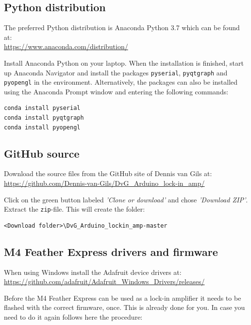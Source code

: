 \documentclass{article}
\newcommand{\code}[1]{\mbox{\texttt{#1}}}
\begin{document}
\subsection{Python distribution}
The preferred Python distribution is Anaconda Python 3.7 which can be found at:\\
\href{https://www.anaconda.com/distribution/}{https://www.anaconda.com/distribution/}

\bigskip\noindent
Install Anaconda Python on your laptop. When the installation is finished, start up Anaconda Navigator and install the packages \code{pyserial}, \code{pyqtgraph} and \code{pyopengl} in the environment. Alternatively, the packages can also be installed using the Anaconda Prompt window and entering the following commands:
\begin{verbatim}
conda install pyserial
conda install pyqtgraph
conda install pyopengl
\end{verbatim}

\subsection{GitHub source}\label{sub:GitHub}
Download the source files from the GitHub site of Dennis van Gils at:\\
\href{https://github.com/Dennis-van-Gils/DvG_Arduino_lock-in_amp/}{https://github.com/Dennis-van-Gils/DvG\_Arduino\_lock-in\_amp/}

\bigskip\noindent
Click on the green button labeled \textit{'Clone or download'} and chose \textit{'Download ZIP'}. Extract the \code{zip}-file. This will create the folder:
\begin{verbatim}
<Download folder>\DvG_Arduino_lockin_amp-master
\end{verbatim}

\subsection{M4 Feather Express drivers and firmware}
When using Windows install the Adafruit device drivers at:\\
\href{https://github.com/adafruit/Adafruit_Windows_Drivers/releases/download/2.3.4/adafruit_drivers_2.3.4.0.exe}{https://github.com/adafruit/Adafruit\_Windows\_Drivers/releases/}

\bigskip\noindent
Before the M4 Feather Express can be used as a lock-in amplifier it needs to be flashed with the correct firmware, once. This is already done for you. In case you need to do it again follows here the procedure:
\end{document}
